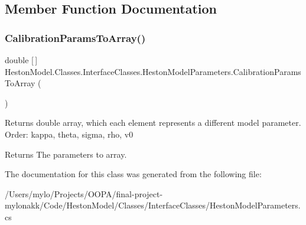 \subsection{Member Function Documentation}
\mbox{\label{class_heston_model_1_1_classes_1_1_interface_classes_1_1_heston_model_parameters_a57292eac146d8d3309bcad9f44ca0027}} 
\subsubsection{\texorpdfstring{Calibration\+Params\+To\+Array()}{CalibrationParamsToArray()}}
{\footnotesize\ttfamily double \mbox{[}$\,$\mbox{]} Heston\+Model.\+Classes.\+Interface\+Classes.\+Heston\+Model\+Parameters.\+Calibration\+Params\+To\+Array (\begin{DoxyParamCaption}{ }\end{DoxyParamCaption})\hspace{0.3cm}{\ttfamily [inline]}}



Returns double array, which each element represents a different model parameter. Order\+: kappa, theta, sigma, rho, v0 

\begin{DoxyReturn}{Returns}
The parameters to array.
\end{DoxyReturn}


The documentation for this class was generated from the following file\+:\begin{DoxyCompactItemize}
\item 
/\+Users/mylo/\+Projects/\+O\+O\+P\+A/final-\/project-\/mylonakk/\+Code/\+Heston\+Model/\+Classes/\+Interface\+Classes/Heston\+Model\+Parameters.\+cs\end{DoxyCompactItemize}
